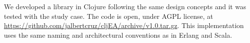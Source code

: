 
We developed a library in Clojure following the same design concepts and it was tested with the study case. The code is open, under AGPL license, at \url{https://github.com/jalbertcruz/cljEA/archive/v1.0.tar.gz}. This implementation uses the same naming and architectural conventions as in Erlang and Scala.
